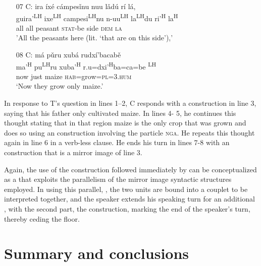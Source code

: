 \begin{itemize}
\item[07 C:] 
\glll ira \'{i}x\'{e} c\'{a}mpes\v{i}nu nuu l\v{a}d\'{u} r\'{i} l\'{a}, \\
guira'\textsuperscript{LH} ixe\textsuperscript{LH} campesi\textsuperscript{LH}nu n-uu\textsuperscript{LH} la\textsuperscript{LH}du ri'\textsuperscript{H}  la\textsuperscript{H} \\
all all peasant \textsc{stat}-be side \textsc{dem} \textsc{la} \\
\glt 'All the peasants here (lit. `that are on this side'),'


\item[08 C:]
\glll m\'{a} p\v{u}ru xub\'{a} rudx\'{i}'bacab\v{e}  \\        
ma'\textsuperscript{H} pu\textsuperscript{LH}ru xuba'\textsuperscript{H} r.u=dxi'\textsuperscript{H}ba=ca=be \textsuperscript{LH}  \\
now just maize \textsc{hab}=grow=\textsc{pl=3.hum}  \\
\glt `Now they grow only maize.' 

\end{itemize}
\z

In response to T's question in lines 1--2, C responds with a  construction in line 3, saying that his father only cultivated maize. In lines 4- 5, he continues this thought stating that in that region maize is the only crop that was grown and does so using an  construction involving the particle \textsc{nga}. He repeats this thought again in line 6 in a verb-less clause. He ends his turn in lines 7-8 with an  construction that is a mirror image of line 3. 

Again, the use of the  construction followed immediately by  can be conceptualized as a  that exploits the parallelism of the mirror image syntactic structures employed. In using this parallel, , the two  units are bound into a couplet to be interpreted together, and the speaker extends his speaking turn for an additional , with the second part, the  construction, marking the end of the speaker's turn, thereby ceding the floor.


\section{Summary and conclusions}


